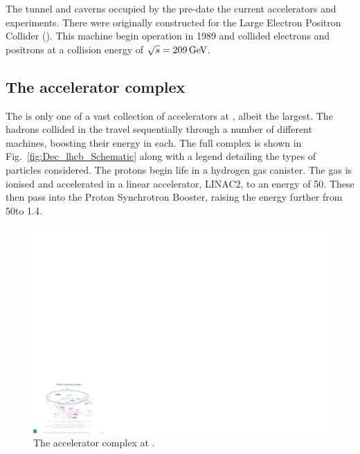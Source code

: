 The tunnel and caverns occupied by the \lhc pre-date the current accelerators and experiments. There were originally constructed for the Large Electron Positron Collider (\lep). This machine begin operation in 1989 and collided electrons and positrons at a collision energy of $\sqrt{s}=209\mathrm{\,Ge\kern -0.1em V}$.  


\subsection{The accelerator complex}

The \lhc is only one of a vast collection of accelerators at \cern, albeit the largest. The hadrons collided in the \lhc travel sequentially through a number of different machines, boosting their energy in each. The full complex is shown in Fig.~\ref{fig:Dec_lhcb_Schematic} along with a legend detailing the types of particles considered. The protons begin life in a hydrogen gas canister. The gas is ionised and accelerated in  a linear accelerator, LINAC2, to an energy of 50\mev. These then pass into the Proton Synchrotron Booster, raising the energy further from 50\mev to 1.4\gev. 

\begin{figure}[!h]
    \centering
    \includegraphics[width=1.0\textwidth]{figs/Detector/Acc_complex.pdf}
    \caption{The accelerator complex at \cern.}
    \label{fig:Dec_Acc_Complex}   
\end{figure}

